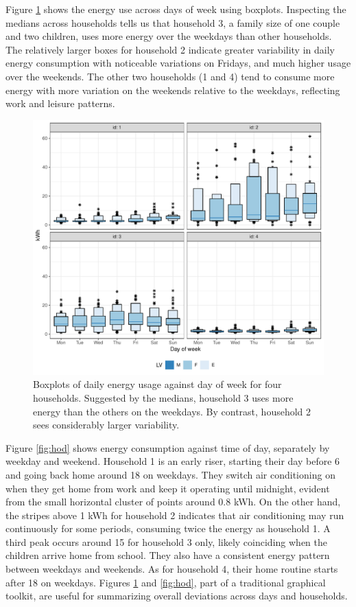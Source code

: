 \documentclass[12pt]{article}
\begin{document}
Figure \ref{fig:dow} shows the energy use across days of week using boxplots. Inspecting the medians across households tells us that household 3, a family size of one couple and two children, uses more energy over the weekdays than other households. The relatively larger boxes for household 2 indicate greater variability in daily energy consumption with noticeable variations on Fridays, and much higher usage over the weekends. The other two households (1 and 4) tend to consume more energy with more variation on the weekends relative to the weekdays, reflecting work and leisure patterns.

\begin{figure}

{\centering \includegraphics[width=\textwidth]{figure/dow-1} 

}

\caption{Boxplots of daily energy usage against day of week for four households. Suggested by the medians, household 3 uses more energy than the others on the weekdays. By contrast, household 2 sees considerably larger variability.}\label{fig:dow}
\end{figure}

Figure \ref{fig:hod} shows energy consumption against time of day, separately by weekday and weekend. Household 1 is an early riser, starting their day before 6 and going back home around 18 on weekdays. They switch air conditioning on when they get home from work and keep it operating until midnight, evident from the small horizontal cluster of points around 0.8 kWh. On the other hand, the stripes above 1 kWh for household 2 indicates that air conditioning may run continuously for some periods, consuming twice the energy as household 1. A third peak occurs around 15 for household 3 only, likely coinciding when the children arrive home from school. They also have a consistent energy pattern between weekdays and weekends. As for household 4, their home routine starts after 18 on weekdays. Figures \ref{fig:dow} and \ref{fig:hod}, part of a traditional graphical toolkit, are useful for summarizing overall deviations across days and households.
\end{document}
